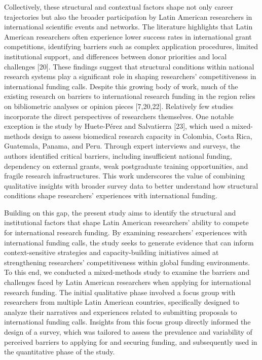 \documentclass[
  letterpaper,
  DIV=11,
  numbers=noendperiod]{scrartcl}
\begin{document}
Collectively, these structural and contextual factors shape not only
career trajectories but also the broader participation by Latin American
researchers in international scientific events and networks. The
literature highlights that Latin American researchers often experience
lower success rates in international grant competitions, identifying
barriers such as complex application procedures, limited institutional
support, and differences between donor priorities and local challenges
{[}20{]}. These findings suggest that structural conditions within
national research systems play a significant role in shaping
researchers' competitiveness in international funding calls. Despite
this growing body of work, much of the existing research on barriers to
international research funding in the region relies on bibliometric
analyses or opinion pieces {[}7,20,22{]}. Relatively few studies
incorporate the direct perspectives of researchers themselves. One
notable exception is the study by Huete-Pérez and Salvatierra {[}23{]},
which used a mixed-methods design to assess biomedical research capacity
in Colombia, Costa Rica, Guatemala, Panama, and Peru. Through expert
interviews and surveys, the authors identified critical barriers,
including insufficient national funding, dependency on external grants,
weak postgraduate training opportunities, and fragile research
infrastructures. This work underscores the value of combining
qualitative insights with broader survey data to better understand how
structural conditions shape researchers' experiences with international
funding.

Building on this gap, the present study aims to identify the structural
and institutional factors that shape Latin American researchers' ability
to compete for international research funding. By examining researchers'
experiences with international funding calls, the study seeks to
generate evidence that can inform context-sensitive strategies and
capacity-building initiatives aimed at strengthening researchers'
competitiveness within global funding environments. To this end, we
conducted a mixed-methods study to examine the barriers and challenges
faced by Latin American researchers when applying for international
research funding. The initial qualitative phase involved a focus group
with researchers from multiple Latin American countries, specifically
designed to analyze their narratives and experiences related to
submitting proposals to international funding calls. Insights from this
focus group directly informed the design of a survey, which was tailored
to assess the prevalence and variability of perceived barriers to
applying for and securing funding, and subsequently used in the
quantitative phase of the study.
\end{document}
